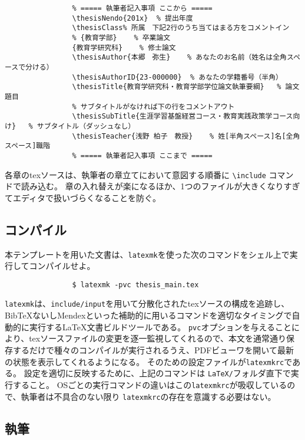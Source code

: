 			\small
			\begin{verbatim}
				% ===== 執筆者記入事項 ここから =====
				\thesisNendo{201x}	% 提出年度
				\thesisClass% 所属　下記2行のうち当てはまる方をコメントイン
				% {教育学部}	% 卒業論文
				{教育学研究科}	% 修士論文
				\thesisAuthor{本郷　弥生}	% あなたのお名前（姓名は全角スペースで分ける）
				\thesisAuthorID{23-000000}	% あなたの学籍番号（半角）
				\thesisTitle{教育学研究科・教育学部学位論文執筆要綱}	% 論文題目
				% サブタイトルがなければ下の行をコメントアウト
				\thesisSubTitle{生涯学習基盤経営コース・教育実践政策学コース向け}	% サブタイトル（ダッシュなし）
				\thesisTeacher{浅野 柏子　教授}	% 姓[半角スペース]名[全角スペース]職階
				% ===== 執筆者記入事項 ここまで =====
			\end{verbatim}
			\normalsize

			各章のtexソースは、執筆者の章立てにおいて意図する順番に \texttt{\textbackslash include} コマンドで読み込む。
			章の入れ替えが楽になるほか、1つのファイルが大きくなりすぎてエディタで扱いづらくなることを防ぐ。

		\subsection{コンパイル}
			\label{sub:compile}

			本テンプレートを用いた文書は、\texttt{latexmk}を使った次のコマンドをシェル上で実行してコンパイルせよ。

			\begin{verbatim}
				$ latexmk -pvc thesis_main.tex
			\end{verbatim}

			\texttt{latexmk}は、\texttt{include/input}を用いて分散化されたtexソースの構成を追跡し、BibTeXないしMendexといった補助的に用いるコマンドを適切なタイミングで自動的に実行する\LaTeX 文書ビルドツールである。
			\texttt{pvc}オプションを与えることにより、texソースファイルの変更を逐一監視してくれるので、本文を通常通り保存するだけで種々のコンパイルが実行されるうえ、PDFビューワを開いて最新の状態を表示してくれるようになる。
			そのための設定ファイルが\texttt{latexmkrc}である。
			設定を適切に反映するために、上記のコマンドは \texttt{LaTeX/}フォルダ直下で実行すること。
			OSごとの実行コマンドの違いはこの\texttt{latexmkrc}が吸収しているので、執筆者は不具合のない限り \texttt{latexmkrc}の存在を意識する必要はない。

		\subsection{執筆}
			\label{sub:writing}

